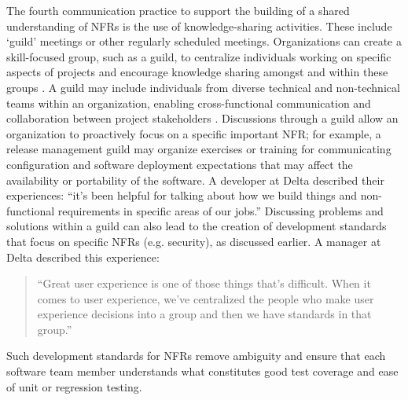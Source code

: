 \documentclass[smallextended]{svjour3}       %
\begin{document}
The fourth communication practice to support the building of a shared understanding of NFRs is the use of knowledge-sharing activities. These include `guild' meetings or other regularly scheduled meetings.
Organizations can create a skill-focused group, such as a guild, to centralize individuals working on specific aspects of projects and encourage knowledge sharing amongst and within these groups \cite[cf.][]{stol2022gamification}.
A guild may include individuals from diverse technical and non-technical teams within an organization, enabling cross-functional communication and collaboration between project stakeholders \citep{cooper2018}. 
Discussions through a guild allow an organization to proactively focus on a specific important NFR; for example, a release management guild may organize exercises or training for communicating configuration and software deployment expectations that may affect the availability or portability of the software. A developer at Delta described their experiences:
\textmd{``it's been helpful for talking about how we build things and non-functional requirements in specific areas of our jobs.''}
Discussing problems and solutions within a guild can also lead to the creation of development standards that focus on specific NFRs (e.g. security), as discussed earlier. 
A manager at Delta described this experience:
\begin{quote}
    ``Great user experience is one of those things that’s difficult. When it comes to user experience, we've centralized the people who make user experience decisions into a group and then we have standards in that group.''   
\end{quote}
Such development standards for NFRs remove ambiguity and ensure that each software team member understands what constitutes good test coverage and ease of unit or regression testing.  
\end{document}

